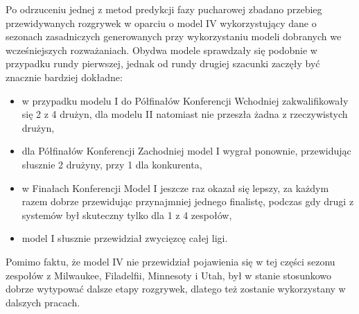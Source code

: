\documentclass[inzynierska]{pwr_wmat_praca_dyplomowa}
\theoremstyle{plain}
\numberwithin{theorem}{chapter}
\theoremstyle{definition}
\numberwithin{theorem}{chapter}
\begin{document}
Po odrzuceniu jednej z metod predykcji fazy pucharowej zbadano przebieg przewidywanych rozgrywek w oparciu o model IV wykorzystujący dane o sezonach zasadniczych generowanych przy wykorzystaniu modeli dobranych we wcześniejszych rozważaniach. Obydwa modele sprawdzały się podobnie w przypadku rundy pierwszej, jednak od rundy drugiej szacunki zaczęły być znacznie bardziej dokładne:
\begin{itemize}
	\item w przypadku modelu I do Półfinałów Konferencji Wchodniej zakwalifikowały się 2 z 4 drużyn, dla modelu II natomiast nie przeszła żadna z rzeczywistych drużyn,
	\item dla Półfinałów Konferencji Zachodniej model I wygrał ponownie,  przewidując słusznie 2 drużyny, przy 1 dla konkurenta,
	\item w Finałach Konferencji Model I jeszcze raz okazał się lepszy, za każdym razem dobrze przewidując przynajmniej jednego finalistę, podczas gdy drugi z systemów był skuteczny tylko dla 1 z 4 zespołów,
	\item model I słusznie przewidział zwycięzcę całej ligi.
\end{itemize}
Pomimo faktu, że model IV nie przewidział pojawienia się w tej części sezonu zespołów z Milwaukee, Filadelfii, Minnesoty i Utah, był w stanie stosunkowo dobrze wytypować dalsze etapy rozgrywek, dlatego też zostanie wykorzystany w dalszych pracach.
\end{document}
